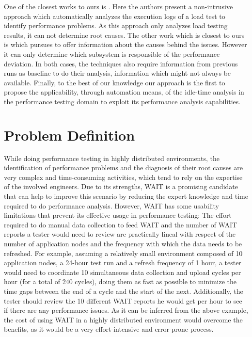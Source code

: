 \documentclass[runningheads,a4paper]{llncs}
\begin{document}
One of the closest works to ours is \cite{Jiang2009}. Here the authors present a
non-intrusive approach which automatically analyzes the execution logs of a load
test to identify performance problems. As this approach only analyzes load
testing results, it can not determine root causes. The other work which is
closest to ours is \cite{Malik1} which pursues to offer information about the
causes behind the issues. However it can only determine which subsystem is
responsible of the performance deviation. In both cases, the techniques
also require information from previous runs as baseline to do their analysis,
information which might not always be available. Finally, to the best of our knowledge our
approach is the first to propose the applicability, through automation means, of
the idle-time analysis in the performance testing domain to exploit its performance analysis capabilities.


\section{Problem Definition}

While doing performance testing in highly distributed environments, the
identification of performance problems and the diagnosis of their root causes
are very complex and time-consuming activities, which tend to rely on the
expertise of the involved engineers. Due to its strengths, WAIT is a promising
candidate that can help to improve this scenario by reducing the expert
knowledge and time required to do performance analysis. However, WAIT has some
usability limitations that prevent its effective usage in performance
testing: The effort required to do manual data collection to feed WAIT and the
number of WAIT reports a tester would need to review are practically lineal with
respect of the number of application nodes and the frequency with which the data
needs to be refreshed. For example, assuming a relatively small environment
composed of 10 application nodes, a 24-hour test run and a refresh frequency of
1 hour, a tester would need to coordinate 10 simultaneous data collection and
upload cycles per hour (for a total of 240 cycles), doing them as fast as
possible to minimize the time gaps between the end of a cycle and the start of the next.
Additionally, the tester should review the 10 different WAIT reports he would
get per hour to see if there are any performance issues. As it can be inferred
from the above example, the cost of using WAIT in a highly distributed
environment would overcome the benefits, as it would be a very effort-intensive
and error-prone process.
\end{document}
